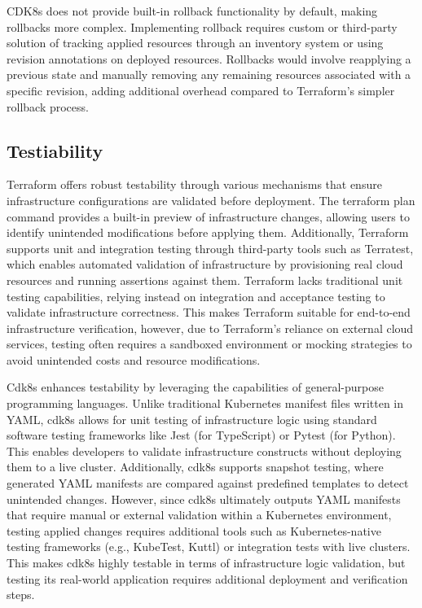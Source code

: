\documentclass{article}
\begin{document}
CDK8s does not provide built-in rollback functionality by default, making rollbacks more complex. Implementing rollback requires custom or third-party solution of tracking applied resources through an inventory system or using revision annotations on deployed resources. Rollbacks would involve reapplying a previous state and manually removing any remaining resources associated with a specific revision, adding additional overhead compared to Terraform’s simpler rollback process.

\subsection{Testiability}
Terraform offers robust testability through various mechanisms that ensure infrastructure configurations are validated before deployment. The terraform plan command provides a built-in preview of infrastructure changes, allowing users to identify unintended modifications before applying them. Additionally, Terraform supports unit and integration testing through third-party tools such as Terratest, which enables automated validation of infrastructure by provisioning real cloud resources and running assertions against them. Terraform lacks traditional unit testing capabilities, relying instead on integration and acceptance testing to validate infrastructure correctness. This makes Terraform suitable for end-to-end infrastructure verification, however, due to Terraform’s reliance on external cloud services, testing often requires a sandboxed environment or mocking strategies to avoid unintended costs and resource modifications.

Cdk8s enhances testability by leveraging the capabilities of general-purpose programming languages. Unlike traditional Kubernetes manifest files written in YAML, cdk8s allows for unit testing of infrastructure logic using standard software testing frameworks like Jest (for TypeScript) or Pytest (for Python). This enables developers to validate infrastructure constructs without deploying them to a live cluster. Additionally, cdk8s supports snapshot testing, where generated YAML manifests are compared against predefined templates to detect unintended changes. However, since cdk8s ultimately outputs YAML manifests that require manual or external validation within a Kubernetes environment, testing applied changes requires additional tools such as Kubernetes-native testing frameworks (e.g., KubeTest, Kuttl) or integration tests with live clusters. This makes cdk8s highly testable in terms of infrastructure logic validation, but testing its real-world application requires additional deployment and verification steps.
\end{document}
